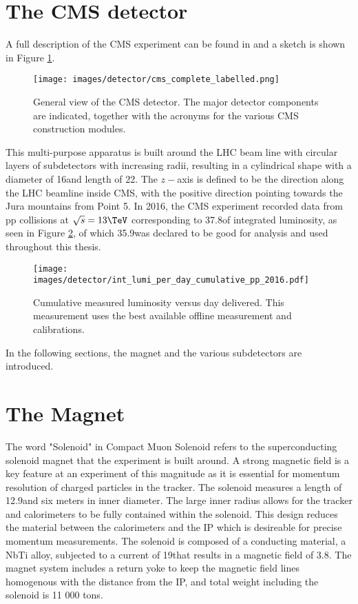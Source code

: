 \section{The CMS detector}
\noindent\justify
A full description of the CMS experiment can be found in \cite{Chatrchyan:2008aa} and a sketch is shown in Figure \ref{fig:CMS}.
\begin{figure}[!htp]
  \centering
   \texttt{[image: images/detector/cms\_complete\_labelled.png]}
   \caption{General view of the CMS detector. The major detector components are indicated, together with the acronyms for the various CMS construction modules.\cite{Chatrchyan:2009hb}}
   \label{fig:CMS}
\end{figure}                                                                                                                                                                                    
This multi-purpose apparatus is built around the LHC beam line with circular layers of subdetectors with increasing radii, resulting in a cylindrical shape with a diameter of 16\m and length of 22\m.
The $z-$axis is defined to be the direction along the LHC beamline inside CMS, with the positive direction pointing towards the Jura mountains from Point 5.  
In 2016, the CMS experiment recorded data from pp collisions at $\sqrt{s}=13\TeV$ corresponding to 37.8\fbinv of integrated luminosity, as seen in Figure \ref{fig:lumi}, of which 35.9\fbinv was declared to be good for analysis and used throughout this thesis. 
\begin{figure}[!htp]
  \centering
   \texttt{[image: images/detector/int\_lumi\_per\_day\_cumulative\_pp\_2016.pdf]}
   \caption{Cumulative measured luminosity versus day delivered. This measurement uses the best available offline measurement and calibrations. \cite{lumi}}
   \label{fig:lumi}
\end{figure}                                                                               
In the following sections, the magnet and the various subdetectors are introduced. 
\section{The Magnet}
\noindent\justify
The word "Solenoid" in Compact Muon Solenoid refers to the superconducting solenoid magnet that the experiment is built around. 
A strong magnetic field is a key feature at an experiment of this magnitude as it is essential for momentum resolution of charged particles in the tracker. 
The solenoid measures a length of 12.9\m and six meters in inner diameter. 
The large inner radius allows for the tracker and calorimeters to be fully contained within the solenoid. 
This design reduces the material between the calorimeters and the IP which is desireable for precise momentum measurements. 
The solenoid is composed of a conducting material, a NbTi alloy, subjected to a current of 19\kA that results in a magnetic field of 3.8\T. 
The magnet system includes a return yoke to keep the magnetic field lines homogenous with the distance from the IP, and total weight including the solenoid is 11 000 tons.  
\cite{CERN-LHCC-97-010}
